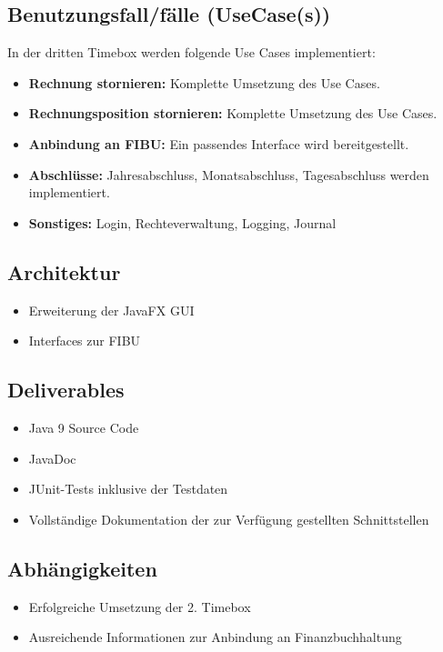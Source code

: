 \documentclass[../Pflichtenheft.tex]{subfiles}
\begin{document}
    \subsection{Benutzungsfall/fälle (UseCase(s)) }
    In der dritten Timebox werden folgende Use Cases implementiert:
    \begin{itemize}
        \item \textbf{Rechnung stornieren: } Komplette Umsetzung des Use Cases.
        \item \textbf{Rechnungsposition stornieren: } Komplette Umsetzung des Use Cases.
        \item \textbf{Anbindung an FIBU: } Ein passendes Interface wird bereitgestellt.
        \item \textbf{Abschlüsse: } Jahresabschluss, Monatsabschluss, Tagesabschluss werden implementiert.
        \item \textbf{Sonstiges: } Login, Rechteverwaltung, Logging, Journal
    \end{itemize}
    \subsection{Architektur}
    \begin{itemize}
        \item Erweiterung der JavaFX GUI
        \item Interfaces zur FIBU
    \end{itemize}
    \subsection{Deliverables}
    \begin{itemize}
        \item Java 9 Source Code
        \item JavaDoc
        \item JUnit-Tests inklusive der Testdaten
        \item Vollständige Dokumentation der zur Verfügung gestellten Schnittstellen
    \end{itemize}
    \subsection{Abhängigkeiten}
    \begin{itemize}
        \item Erfolgreiche Umsetzung der 2. Timebox
        \item Ausreichende Informationen zur Anbindung an Finanzbuchhaltung
    \end{itemize}
\end{document}
